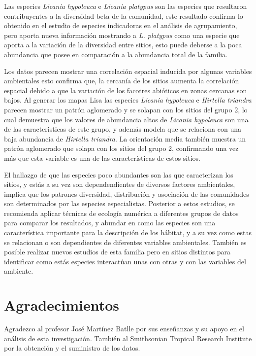 \documentclass[11pt,]{article}
\begin{document}
Las especies \emph{Licania hypoleuca} e \emph{Licania platypus} son las
especies que resultaron contribuyentes a la diversidad beta de la
comunidad, este resultado confirma lo obtenido en el estudio de especies
indicadoras en el análisis de agrupamiento, pero aporta nueva
información mostrando a \emph{L. platypus} como una especie que aporta a
la variación de la diversidad entre sitios, esto puede deberse a la poca
abundancia que posee en comparación a la abundancia total de la familia.

Los datos parecen mostrar una correlación espacial inducida por algunas
variables ambientales esto confirma que, la cercanía de los sitios
aumenta la correlación espacial debido a que la variación de los
facotres abióticos en zonas cercanas son bajos. Al generar los mapas
Lisa las especies \emph{Licania hypoleuca} e \emph{Hirtella triandra}
parecen mostrar un patrón aglomerado y se solapan con los sitios del
grupo 2, lo cual demuestra que los valores de abundancia altos de
\emph{Licania hypoleuca} son una de las caracteristicas de este grupo, y
además modela que se relaciona con una baja abundancia de \emph{Hirtella
triandra}. La orientación media también muestra un patrón aglomerado que
solapa con los sitios del grupo 2, confirmando una vez más que esta
variable es una de las características de estos sitios.

El hallazgo de que las especies poco abundantes son las que caracterizan
los sitios, y estás a su vez son dependendientes de diversos factores
ambientales, implica que los patrones diversidad, distribución y
asociación de las comunidades son determinados por las especies
especialistas. Posterior a estos estudios, se recomienda aplicar
técnicas de ecología numérica a diferentes grupos de datos para comparar
los resultados, y abundar en como las especies son una característica
importante para la descripción de los hábitat, y a su vez como estas se
relacionan o son dependientes de diferentes variables ambientales.
También es posible realizar nuevos estudios de esta familia pero en
sitios distintos para identificar como estás especies interactúan unas
con otras y con las variables del ambiente.

\section{Agradecimientos}\label{agradecimientos}

Agradezco al profesor José Martínez Batlle por sus enseñanzas y su apoyo
en el análisis de esta investigación. También al Smithsonian Tropical
Research Institute por la obtención y el suministro de los datos.
\end{document}
